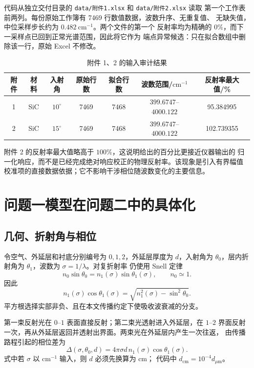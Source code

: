 \documentclass[UTF8,12pt,a4paper]{ctexart}
\begin{document}
代码从独立交付目录的 \verb|data/附件1.xlsx| 和 \verb|data/附件2.xlsx| 读取
第一个工作表前两列。每份原始工作簿有 7469 行数值数据，波数升序、无重复值、
无缺失值，中位采样步长约为 $0.482\ \mathrm{cm}^{-1}$。两个文件的第一个
反射率均为精确的 $0\%$，而下一采样点已回到正常光谱范围，因此将它作为
端点异常候选：只在拟合数组中删除该一行，原始 Excel 不修改。

\begin{table}[H]
  \centering
  \caption{附件 1、2 的输入审计结果}
  \label{tab:data-audit}
  \small
  \setlength{\tabcolsep}{3pt}
  \begin{tabular}{ccccccc}
    \toprule
    附件 & 材料 & 入射角 & 原始行数 & 拟合行数 & 波数范围/$\mathrm{cm}^{-1}$ & 反射率最大值/\%\\
    \midrule
    1 & SiC & $10^\circ$ & 7469 & 7468 & $399.6747$--$4000.122$ & 95.384995\\
    2 & SiC & $15^\circ$ & 7469 & 7468 & $399.6747$--$4000.122$ & 102.739355\\
    \bottomrule
  \end{tabular}
\end{table}

附件 2 的反射率最大值略高于 $100\%$，这说明给出的百分比更接近仪器输出的
归一化响应，而不是已经完成绝对响应校正的物理反射率。该现象是引入有界幅值
校准项的直接数据依据；它不影响干涉相位随波数变化的主要信息。

\section{问题一模型在问题二中的具体化}

\subsection{几何、折射角与相位}

令空气、外延层和衬底分别编号为 $0,1,2$，外延层厚度为 $d$，入射角为
$\theta_0$，层内折射角为 $\theta_1$，波数为 $\sigma=1/\lambda$。对复折射率
仍使用 Snell 定律
\begin{equation}
  n_0\sin\theta_0=n_1(\sigma)\sin\theta_1(\sigma),
  \qquad n_0\simeq 1.
  \label{eq:snell}
\end{equation}
因此
\begin{equation}
  n_1(\sigma)\cos\theta_1(\sigma)
  =\sqrt{n_1^2(\sigma)-\sin^2\theta_0}.
  \label{eq:ncos}
\end{equation}
平方根选择实部非负、且在本文传播约定下使吸收波衰减的分支。

第一束反射光在 $0$--$1$ 表面直接反射；第二束光透射进入外延层，在 $1$--$2$
界面反射一次，再从外延层返回并透射出界面。两束光在外延层内产生一次往返，
由传播路程引起的相位差为
\begin{equation}
  \Delta(\sigma,\theta_0,d)
  =4\pi\sigma d\,n_1(\sigma)\cos\theta_1(\sigma).
  \label{eq:delta}
\end{equation}
式中若 $\sigma$ 以 $\mathrm{cm}^{-1}$ 输入，则 $d$ 必须先换算为 cm；
代码中 $d_{\mathrm{cm}}=10^{-4}d_{\mu\mathrm{m}}$。
\end{document}
